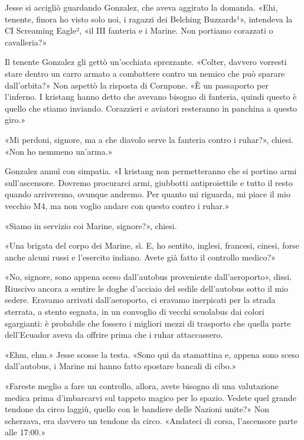 Jesse si accigliò guardando Gonzalez, che aveva aggirato la domanda.
«Ehi, tenente, finora ho visto solo noi, i ragazzi dei Belching
Buzzards¹», intendeva la CI Screaming Eagle², «il III fanteria e i
Marine. Non portiamo corazzati o cavalleria?»

Il tenente Gonzalez gli gettò un'occhiata sprezzante. «Colter, davvero
vorresti stare dentro un carro armato a combattere contro un nemico che
può sparare dall'orbita?» Non aspettò la risposta di Cornpone. «È un
passaporto per l'inferno. I kristang hanno detto che avevano bisogno di
fanteria, quindi questo è quello che stiamo inviando. Corazzieri e
aviatori resteranno in panchina a questo giro.»

«Mi perdoni, signore, ma a che diavolo serve la fanteria contro i
ruhar?», chiesi. «Non ho nemmeno un'arma.»

Gonzalez annuì con simpatia. «I kristang non permetteranno che si
portino armi sull'ascensore. Dovremo procurarci armi, giubbotti
antiproiettile e tutto il resto quando arriveremo, ovunque andremo. Per
quanto mi riguarda, mi piace il mio vecchio M4, ma non voglio andare con
questo contro i ruhar.»

«Siamo in servizio coi Marine, signore?», chiesi.

«Una brigata del corpo dei Marine, sì. E, ho sentito, inglesi, francesi,
cinesi, forse anche alcuni russi e l'esercito indiano. Avete già fatto
il controllo medico?»

«No, signore, sono appena sceso dall'autobus proveniente
dall'aeroporto», dissi. Riuscivo ancora a sentire le doghe d'acciaio del
sedile dell'autobus sotto il mio sedere. Eravamo arrivati
dall'aeroporto, ci eravamo inerpicati per la strada sterrata, a stento
segnata, in un convoglio di vecchi scuolabus dai colori sgargianti: è
probabile che fossero i migliori mezzi di trasporto che quella parte
dell'Ecuador aveva da offrire prima che i ruhar attaccassero.

«Ehm, ehm.» Jesse scosse la testa. «Sono qui da stamattina e, appena
sono sceso dall'autobus, i Marine mi hanno fatto spostare bancali di
cibo.»

«Fareste meglio a fare un controllo, allora, avete bisogno di una
valutazione medica prima d'imbarcarvi sul tappeto magico per lo spazio.
Vedete quel grande tendone da circo laggiù, quello con le bandiere delle
Nazioni unite?» Non scherzava, era davvero un tendone da circo.
«Andateci di corsa, l'ascensore parte alle 17:00.»

\hfill\break

